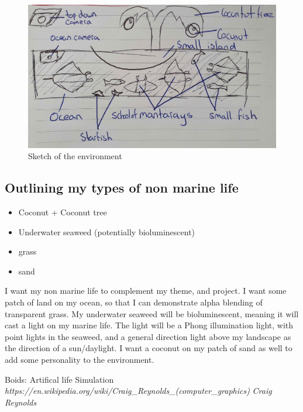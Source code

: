 \documentclass[a4paper, 10pt]{article}
\begin{document}
\begin{figure}[h!]
    \centering
    \includegraphics[scale=0.1]{images/sketch.jpg}
    \caption{Sketch of the environment}
    \label{fig:environment}
\end{figure}

\newpage

\subsection{Outlining my types of non marine life}
\begin{itemize}
    \item Coconut + Coconut tree
    \item Underwater seaweed (potentially bioluminescent)
    \item grass
    \item sand
\end{itemize}

I want my non marine life to complement my theme, and project. I want some patch of land on my ocean, so that I can demonstrate alpha blending of transparent grass. My underwater seaweed
will be bioluminescent, meaning it will cast a light on my marine life. The light will be a Phong illumination light, with point lights in the seaweed, and a general direction light above
my landscape as the direction of a sun/daylight. I want a coconut on my patch of sand as well to add some personality to the environment.

\begin{thebibliography}{9}
Boids: Artifical life Simulation
\textit{https://en.wikipedia.org/wiki/Craig\_Reynolds\_(computer\_graphics)}
\textit{Craig Reynolds}
\end{thebibliography}
\end{document}
